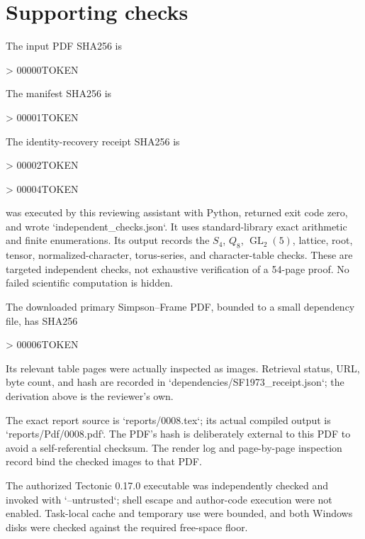\documentclass[10pt]{article}
\begin{document}
\section*{Supporting checks}
The input PDF SHA256 is\par
> 00000TOKEN\par
The manifest SHA256 is\par
> 00001TOKEN\par
The identity-recovery receipt SHA256 is\par
> 00002TOKEN\par
> 00004TOKEN\par
was executed by this reviewing assistant with Python, returned exit code zero, and wrote `independent\_checks.json`. It uses standard-library exact arithmetic and finite enumerations. Its output records the \(S_4\), \(Q_8\), \(\operatorname{GL}_2(5)\), lattice, root, tensor, normalized-character, torus-series, and character-table checks. These are targeted independent checks, not exhaustive verification of a 54-page proof. No failed scientific computation is hidden.\par
The downloaded primary Simpson–Frame PDF, bounded to a small dependency file, has SHA256\par
> 00006TOKEN\par
Its relevant table pages were actually inspected as images. Retrieval status, URL, byte count, and hash are recorded in `dependencies/SF1973\_receipt.json`; the derivation above is the reviewer’s own.\par
The exact report source is `reports/0008.tex`; its actual compiled output is `reports/Pdf/0008.pdf`. The PDF’s hash is deliberately external to this PDF to avoid a self-referential checksum. The render log and page-by-page inspection record bind the checked images to that PDF.\par
The authorized Tectonic 0.17.0 executable was independently checked and invoked with `--untrusted`; shell escape and author-code execution were not enabled. Task-local cache and temporary use were bounded, and both Windows disks were checked against the required free-space floor.\par
\end{document}
